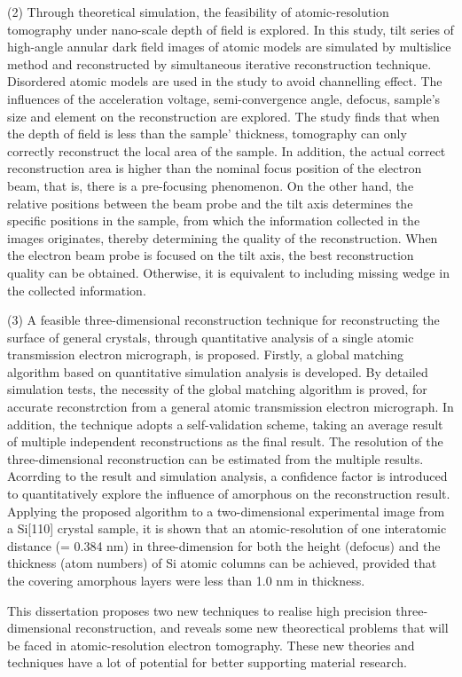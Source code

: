 {(2) Through theoretical simulation, the feasibility of atomic-resolution tomography under nano-scale depth of field is explored. In this study, tilt series of high-angle annular dark field images of atomic models are simulated by multislice method and reconstructed by simultaneous iterative reconstruction technique. Disordered atomic models are used in the study to avoid channelling effect. The influences of the acceleration voltage, semi-convergence angle, defocus, sample's size and element on the reconstruction are explored. The study finds that when the depth of field is less than the sample' thickness, tomography can only correctly reconstruct the local area of the sample. In addition, the actual correct reconstruction area is higher than the nominal focus position of the electron beam, that is, there is a pre-focusing phenomenon. On the other hand, the relative positions between the beam probe and the tilt axis determines the specific positions in the sample, from which the information collected in the images originates, thereby determining the quality of the reconstruction. When the electron beam probe is focused on the tilt axis, the best reconstruction quality can be obtained. Otherwise, it is equivalent to including missing wedge in the collected information.

(3) A feasible three-dimensional reconstruction technique for reconstructing the surface of general crystals, through quantitative analysis of a single atomic transmission electron micrograph, is proposed. Firstly, a global matching algorithm based on quantitative simulation analysis is developed. By detailed simulation tests, the necessity of the global matching algorithm is proved, for accurate reconstrction from a general atomic transmission electron micrograph. In addition, the technique adopts a self-validation scheme, taking an average result of multiple independent reconstructions as the final result. The resolution of the three-dimensional reconstruction can be estimated from the multiple results. Acorrding to the result and simulation analysis, a confidence factor is introduced to quantitatively explore the influence of amorphous on the reconstruction result. Applying the proposed algorithm to a two-dimensional experimental image from a Si[110] crystal sample, it is shown that an atomic-resolution of one interatomic distance (= 0.384 nm) in three-dimension for both the
height (defocus) and the thickness (atom numbers) of Si atomic columns can be achieved, provided that the covering amorphous layers were less than 1.0 nm in thickness.


This dissertation proposes two new techniques to realise high precision three-dimensional reconstruction, and reveals some new theorectical problems that will be faced in atomic-resolution electron tomography. These new theories and techniques have a lot of potential for better supporting material research. 


}

